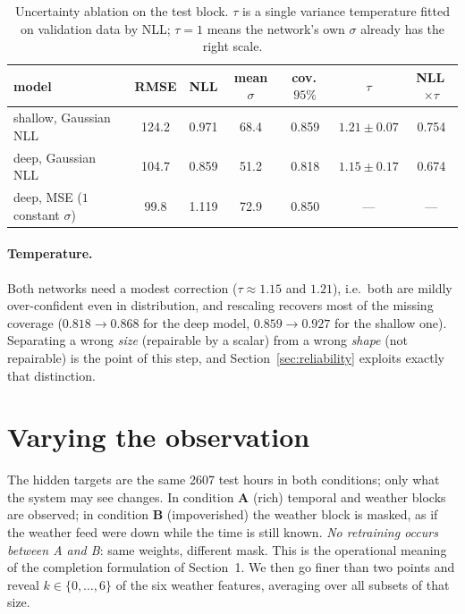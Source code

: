 \documentclass[11pt,a4paper]{article}
\begin{document}
\begin{table}[t]
\centering
\caption{Uncertainty ablation on the test block. $\tau$ is a single variance temperature fitted on
validation data by NLL; $\tau=1$ means the network's own $\sigma$ already has the right scale.}
\label{tab:unc}
\small
\begin{tabular}{lcccccc}
\toprule
model & RMSE & NLL & mean $\sigma$ & cov.\,$95\%$ & $\tau$ & NLL\,$\times\tau$ \\
\midrule
shallow, Gaussian NLL          & 124.2 & 0.971 & 68.4 & 0.859 & $1.21\pm0.07$ & 0.754 \\
deep, Gaussian NLL             & 104.7 & 0.859 & 51.2 & 0.818 & $1.15\pm0.17$ & 0.674 \\
deep, MSE ($1$ constant $\sigma$) & 99.8 & 1.119 & 72.9 & 0.850 & --- & --- \\
\bottomrule
\end{tabular}
\end{table}

\paragraph{Temperature.}
Both networks need a modest correction ($\tau\approx1.15$ and $1.21$), i.e.\ both are mildly
over-confident even in distribution, and rescaling recovers most of the missing coverage
($0.818\to0.868$ for the deep model, $0.859\to0.927$ for the shallow one). Separating a wrong
\emph{size} (repairable by a scalar) from a wrong \emph{shape} (not repairable) is the point of this
step, and Section~\ref{sec:reliability} exploits exactly that distinction.

\section{Varying the observation}\label{sec:obs}

The hidden targets are the same \num{2607} test hours in both conditions; only what the system may see
changes. In condition \textbf{A} (rich) temporal and weather blocks are observed; in condition
\textbf{B} (impoverished) the weather block is masked, as if the weather feed were down while the time
is still known. \emph{No retraining occurs between A and B}: same weights, different mask. This is the
operational meaning of the completion formulation of Section~1. We then go finer than two points and
reveal $k\in\{0,\dots,6\}$ of the six weather features, averaging over all subsets of that size.
\end{document}
